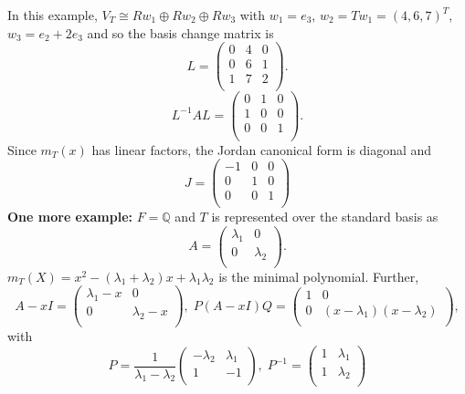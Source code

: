 In this example, $V_T \cong R w_1 \oplus Rw_2 \oplus Rw_3$ with $w_1= e_3$, $w_2=Tw_1 = (4,6,7)^T$,
$w_3 = e_2+2 e_3$ and so the basis change matrix is
$$
L =
\left(
\begin{array}{ccc}
0 & 4 & 0\\
0 & 6 & 1\\
1  & 7 & 2\\
\end{array}
\right).
$$
$$
L^{-1}AL =
\left(
\begin{array}{ccc}
0 & 1 & 0\\
1 & 0 & 0\\
0  & 0 & 1\\
\end{array}
\right).
$$
Since $m_T(x)$ has linear factors, the Jordan canonical form is diagonal and
$$
J =
\left(
\begin{array}{ccc}
-1 & 0 & 0\\
0 & 1 & 0\\
0  & 0 & 1\\
\end{array}
\right)
$$
{\bf One more example:} $F = \mathbb{Q}$ and $T$ is represented over the standard basis as
$$
A =
\left(
\begin{array}{cc}
\lambda_1 & 0\\
0 & \lambda_2 \\
\end{array}
\right).
$$
$m_T(X)= x^2 -(\lambda_1 + \lambda_2) x + \lambda_1 \lambda_2$ is the minimal polynomial.  Further,
$$
A-xI = 
\left(
\begin{array}{cc}
\lambda_1  - x& 0\\
0 & \lambda_2 - x\\
\end{array}
\right), \;
P(A-xI)Q = 
\left(
\begin{array}{cc}
1 & 0\\
0 & (x - \lambda_1) (x - \lambda_2)\\
\end{array}
\right),
$$
with
$$
P =
{\frac 1 {\lambda_1 - \lambda_2}}
\left(
\begin{array}{cc}
- \lambda_2 & \lambda_1\\
1 & -1\\
\end{array}
\right), \;
P^{-1}=
\left(
\begin{array}{cc}
1 & \lambda_1\\
1 & \lambda_2\\
\end{array}
\right)
$$

